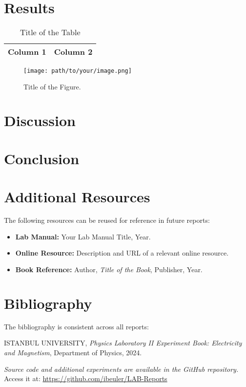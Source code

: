 \documentclass[journal]{IEEEtran}
\begin{document}
\section{Results}
\begin{table}[H]
    \centering
    \caption{Title of the Table}
    \begin{tabular}{|c|c|}
        \hline
        Column 1 & Column 2 \\ \hline
    \end{tabular}
    \label{tab:your_table_label}
\end{table}

\begin{figure}[H]
    \centering
    \texttt{[image: path/to/your/image.png]}
    \caption{Title of the Figure.}
    \label{fig:your_figure_label}
\end{figure}

\section{Discussion}

\section{Conclusion}

\section{Additional Resources}
The following resources can be reused for reference in future reports:
\begin{itemize}
    \item \textbf{Lab Manual:} Your Lab Manual Title, Year.
    \item \textbf{Online Resource:} Description and URL of a relevant online resource.
    \item \textbf{Book Reference:} Author, \textit{Title of the Book}, Publisher, Year.
\end{itemize}

\section{Bibliography}
The bibliography is consistent across all reports:
\begin{thebibliography}{9}
    ISTANBUL UNIVERSITY, 
    \textit{Physics Laboratory II Experiment Book: Electricity and Magnetism}, 
    Department of Physics, 2024.

    \textit{Source code and additional experiments are available in the GitHub repository.} \\ 
    Access it at: \url{https://github.com/ibeuler/LAB-Reports}

\end{thebibliography}
\end{document}
